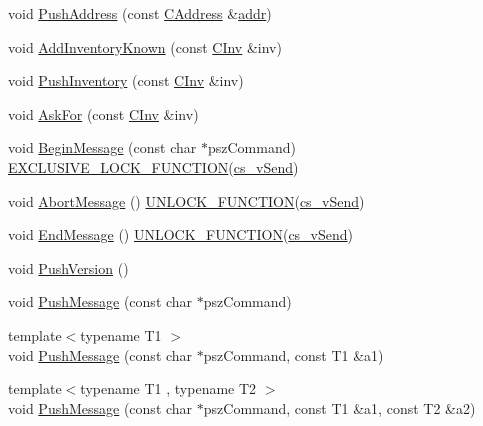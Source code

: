 \begin{DoxyCompactItemize}
\item 
void \hyperlink{class_c_node_a06950a5ce265a1d4df1aad7f28e6fde8}{Push\+Address} (const \hyperlink{class_c_address}{C\+Address} \&\hyperlink{class_c_node_a3993ecb1de2a2135a3cf0904346a6f88}{addr})
\item 
void \hyperlink{class_c_node_ac3054eb6ade84e8968f032ce3e700f6a}{Add\+Inventory\+Known} (const \hyperlink{class_c_inv}{C\+Inv} \&inv)
\item 
void \hyperlink{class_c_node_a7cef2333aa8776127a7e7fcab659eb6a}{Push\+Inventory} (const \hyperlink{class_c_inv}{C\+Inv} \&inv)
\item 
void \hyperlink{class_c_node_ae0def1498409407d1612833a7d38c875}{Ask\+For} (const \hyperlink{class_c_inv}{C\+Inv} \&inv)
\item 
void \hyperlink{class_c_node_af76d193027757002321d0d674290b955}{Begin\+Message} (const char $\ast$psz\+Command) \hyperlink{threadsafety_8h_a77729163b7f6867da40ad5daa5f926f3}{E\+X\+C\+L\+U\+S\+I\+V\+E\+\_\+\+L\+O\+C\+K\+\_\+\+F\+U\+N\+C\+T\+I\+O\+N}(\hyperlink{class_c_node_a79edcac83fc5067567c7b41c26fcc56f}{cs\+\_\+v\+Send})
\item 
void \hyperlink{class_c_node_aae0fdfe555001a60bab8f216c3bc3978}{Abort\+Message} () \hyperlink{threadsafety_8h_abd56e19f9b4781b1a5212a46951cf5c3}{U\+N\+L\+O\+C\+K\+\_\+\+F\+U\+N\+C\+T\+I\+O\+N}(\hyperlink{class_c_node_a79edcac83fc5067567c7b41c26fcc56f}{cs\+\_\+v\+Send})
\item 
void \hyperlink{class_c_node_af8d4b8c0f883afffcb62d906c31b2cdf}{End\+Message} () \hyperlink{threadsafety_8h_abd56e19f9b4781b1a5212a46951cf5c3}{U\+N\+L\+O\+C\+K\+\_\+\+F\+U\+N\+C\+T\+I\+O\+N}(\hyperlink{class_c_node_a79edcac83fc5067567c7b41c26fcc56f}{cs\+\_\+v\+Send})
\item 
void \hyperlink{class_c_node_a4dbfe4f6c1fd162aaa905e4bd201d536}{Push\+Version} ()
\item 
void \hyperlink{class_c_node_a204fda3d33404cb37698c085b1583ab2}{Push\+Message} (const char $\ast$psz\+Command)
\item 
{\footnotesize template$<$typename T1 $>$ }\\void \hyperlink{class_c_node_a07f897794e362a214a1d4d2aa3d68939}{Push\+Message} (const char $\ast$psz\+Command, const T1 \&a1)
\item 
{\footnotesize template$<$typename T1 , typename T2 $>$ }\\void \hyperlink{class_c_node_a67b985781651b8806d7f9976f6fb85a9}{Push\+Message} (const char $\ast$psz\+Command, const T1 \&a1, const T2 \&a2)
\item 

\end{DoxyCompactItemize}
